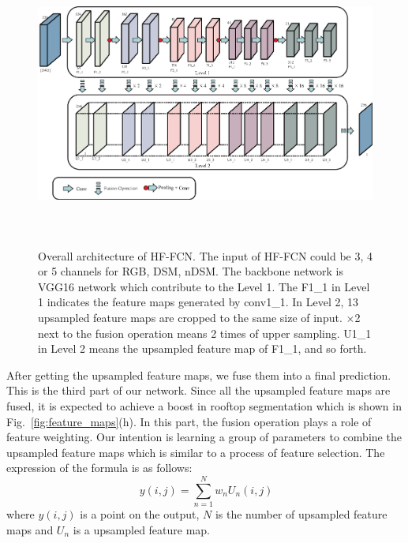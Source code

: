 \begin{figure}
\centering
\includegraphics[width=18cm,height=9.5cm]{Figures/network_architecture.eps}
\centering
\caption{Overall architecture of HF-FCN. The input of HF-FCN could be 3, 4 or 5 channels for RGB, DSM, nDSM. The backbone network is VGG16 network which contribute to the Level 1. The F1\_1 in Level 1 indicates the feature maps generated by conv1\_1. In Level 2, 13 upsampled feature maps are cropped to the same size of input. $\times$2 next to the fusion operation means 2 times of upper sampling. U1\_1 in Level 2 means the upsampled feature map of F1\_1, and so forth.  }
\label{fig:network_architecture}
\end{figure}

After getting the upsampled feature maps, we fuse them into a final prediction. This is the third part of our network.
Since all the upsampled feature maps are fused, it is expected to achieve a boost in rooftop segmentation which is shown in Fig.~\ref{fig:feature_maps}(h).
In this part, the fusion operation plays a role of feature weighting.
Our intention is learning a group of parameters to combine the upsampled feature maps which is similar to a process of feature selection.
The expression of the formula is as follows:
\begin{equation}
    \label{fature_selection}
    \ y(i,j)=\sum_{n=1}^{N}w_{n}U_{n}(i,j)
\end{equation}
where $y(i,j)$ is a point on the output, ${N}$ is the number of upsampled feature maps and ${U_{n}}$ is a upsampled feature map.


